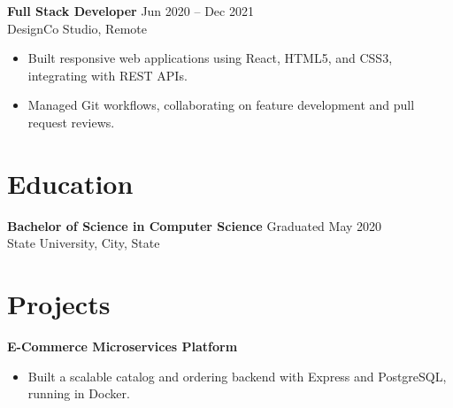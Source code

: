 \documentclass[11pt,a4paper]{article}
\begin{document}
\noindent \textbf{Full Stack Developer} \hfill Jun 2020 -- Dec 2021 \\
DesignCo Studio, Remote
\begin{itemize}[noitemsep,topsep=0pt]
    \item Built responsive web applications using React, HTML5, and CSS3, integrating with REST APIs.
    \item Managed Git workflows, collaborating on feature development and pull request reviews.
\end{itemize}

\section*{Education}
\textbf{Bachelor of Science in Computer Science} \hfill Graduated May 2020 \\
State University, City, State

\section*{Projects}
\textbf{E-Commerce Microservices Platform}
\begin{itemize}[noitemsep,topsep=0pt]
    \item Built a scalable catalog and ordering backend with Express and PostgreSQL, running in Docker.
\end{itemize}
\end{document}
